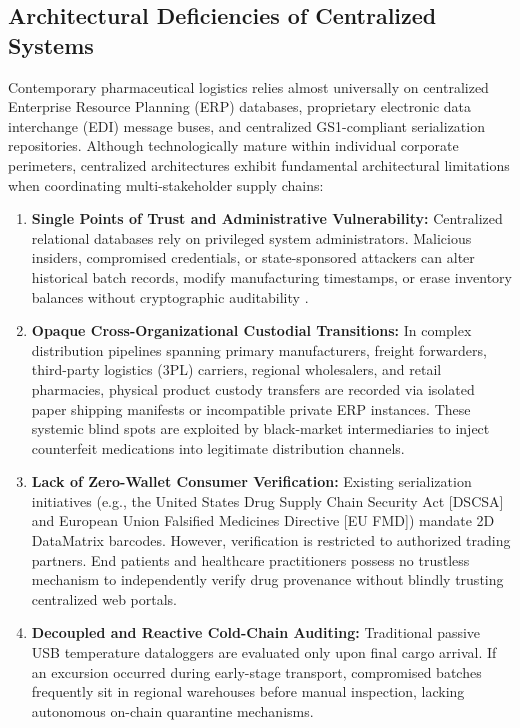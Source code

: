 \documentclass[pdflatex,sn-mathphys-num]{sn-jnl}
\theoremstyle{thmstyleone}
\theoremstyle{thmstyletwo}
\theoremstyle{thmstylethree}
\begin{document}
\subsection{Architectural Deficiencies of Centralized Systems}

Contemporary pharmaceutical logistics relies almost universally on centralized Enterprise Resource Planning (ERP) databases, proprietary electronic data interchange (EDI) message buses, and centralized GS1-compliant serialization repositories. Although technologically mature within individual corporate perimeters, centralized architectures exhibit fundamental architectural limitations when coordinating multi-stakeholder supply chains:

\begin{enumerate}[label=(\roman*)]
    \item \textbf{Single Points of Trust and Administrative Vulnerability:} Centralized relational databases rely on privileged system administrators. Malicious insiders, compromised credentials, or state-sponsored attackers can alter historical batch records, modify manufacturing timestamps, or erase inventory balances without cryptographic auditability \cite{clauson2018leveraging}.
    \item \textbf{Opaque Cross-Organizational Custodial Transitions:} In complex distribution pipelines spanning primary manufacturers, freight forwarders, third-party logistics (3PL) carriers, regional wholesalers, and retail pharmacies, physical product custody transfers are recorded via isolated paper shipping manifests or incompatible private ERP instances. These systemic blind spots are exploited by black-market intermediaries to inject counterfeit medications into legitimate distribution channels.
    \item \textbf{Lack of Zero-Wallet Consumer Verification:} Existing serialization initiatives (e.g., the United States Drug Supply Chain Security Act [DSCSA] and European Union Falsified Medicines Directive [EU FMD]) mandate 2D DataMatrix barcodes. However, verification is restricted to authorized trading partners. End patients and healthcare practitioners possess no trustless mechanism to independently verify drug provenance without blindly trusting centralized web portals.
    \item \textbf{Decoupled and Reactive Cold-Chain Auditing:} Traditional passive USB temperature dataloggers are evaluated only upon final cargo arrival. If an excursion occurred during early-stage transport, compromised batches frequently sit in regional warehouses before manual inspection, lacking autonomous on-chain quarantine mechanisms.
\end{enumerate}
\end{document}
